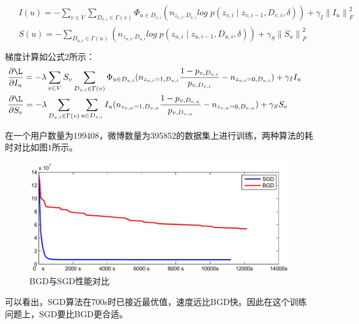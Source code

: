 \documentclass[UTF8]{ctexart}
\begin{document}
\begin{equation}
\begin{matrix}
\begin{aligned}
& I(u)=- \sum _{v \in V}\sum _{D_{v,i}\in \Gamma (v)} \Phi _{u \in D_{v,i}}(n_{z_{v,i},D_{v,i}}log \; p(z_{v,i}\mid z_{v,i-1}, D_{v,i},\delta))+\gamma _{I}\left \| I_{u} \right \|_{F}^{2} & \\
& S(u)=- \sum _{D_{u,i}\in \Gamma (u)}(n_{z_{u,i},D_{u,i}}log \; p(z_{u,i}\mid z_{u,i-1}, D_{u,i},\delta))+\gamma _{S}\left \| S_{u} \right \|_{F}^{2}& \\
\end{aligned}
\end{matrix}
\end{equation} 
梯度计算如公式$2$所示：
\begin{equation}
\begin{matrix}
\begin{aligned}
& \frac{\partial \L}{\partial I_{u}}=-\lambda \sum _{v \in V}S_{v}\sum _{D_{v,i}\in \Gamma (v)} \Phi _{u \in D_{v,i}}(n_{z_{v,i}=1,D_{v,i}}\frac{1-p_{v,D_{v,i}}}{p_{v,D_{v,i}}}-n_{z_{v,i}=0,D_{v,i}})+\gamma _{I}I_{u} & \\
& \frac{\partial \L}{\partial S_{v}}=-\lambda \sum _{D_{v,i}\in \Gamma (v)}\sum _{u \in D_{v,i}} I _{u}(n_{z_{v,u}=1,D_{v,u}}\frac{1-p_{v,D_{v,u}}}{p_{v,D_{v,u}}}-n_{z_{v,u}=0,D_{v,u}})+\gamma _{S}S_{v} & \\
\end{aligned}
\end{matrix}
\end{equation} 
\newline
\par
在一个用户数量为199408，微博数量为395852的数据集上进行训练，两种算法的耗时对比如图$1$所示。
\begin{figure}[h!]
    \centering
    \includegraphics[width=12cm]{BGD.jpg}
    \caption{BGD与SGD性能对比}
    \label{fig-sample}
\end{figure}
可以看出，SGD算法在700s时已接近最优值，速度远比BGD快。因此在这个训练问题上，SGD要比BGD更合适。
\end{document}
